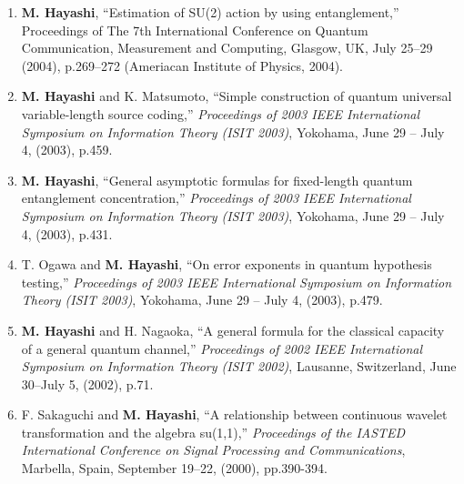 \documentclass[a4paper,12pt,oneside]{article}
\begin{document}
\begin{enumerate}
    \item
    \textbf{M. Hayashi},
    ``Estimation of SU(2) action by using entanglement,'' 
    Proceedings of The 7th International Conference on Quantum Communication, Measurement and Computing, Glasgow, UK, July 25--29 (2004), p.269--272 (Ameriacan Institute of Physics, 2004).
    
    \item
    \textbf{M. Hayashi} and K. Matsumoto, ``Simple construction of quantum universal variable-length source coding,'' 
    {\em Proceedings of 2003 IEEE International Symposium on Information Theory (ISIT 2003)}, 
    Yokohama, June 29 -- July 4, (2003), p.459.
    
    \item
    \textbf{M. Hayashi}, ``General asymptotic formulas for fixed-length quantum entanglement concentration,'' 
    {\em Proceedings of 2003 IEEE International Symposium on Information Theory (ISIT 2003)}, 
    Yokohama, June 29 -- July 4, (2003), p.431.
    
    \item
    T. Ogawa and \textbf{M. Hayashi}, ``On error exponents in quantum hypothesis testing,'' 
    {\em Proceedings of 2003 IEEE International Symposium on Information Theory (ISIT 2003)}, 
    Yokohama, June 29 -- July 4, (2003), p.479.
    
    \item
    \textbf{M. Hayashi} and H. Nagaoka, ``A general formula for the classical capacity of a general quantum channel,'' 
    {\em Proceedings of 2002 IEEE International Symposium on Information Theory (ISIT 2002)}, 
    Lausanne, Switzerland, June 30--July 5, (2002), p.71.
    
    \item
    F. Sakaguchi and \textbf{M. Hayashi}, ``A relationship between continuous wavelet transformation and the algebra su(1,1),'' 
    {\em Proceedings of the IASTED International Conference on Signal Processing and Communications}, Marbella, Spain, September 19--22, (2000), pp.390-394.
\end{enumerate}
\end{document}
